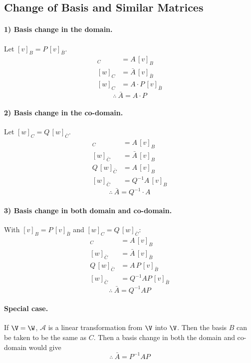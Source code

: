 \subsection{Change of Basis and Similar Matrices}\label{ss:basis-change-rep}

\paragraph{1) Basis change in the domain.} Let $[v]_B=P\,[v]_{\bar B}$.
\begin{align*}
[w]_C&=A\,[v]_B\\
[w]_C&=\bar A\,[v]_{\bar B}\\
[w]_C&=A\cdot P\,[v]_{\bar B}
\end{align*}
\[
\therefore\ \boxed{\bar A=A\cdot P}
\]

\paragraph{2) Basis change in the co-domain.} Let $[w]_C=Q\,[w]_{\bar C}$.
\begin{align*}
[w]_C&=A\,[v]_B\\
[w]_{\bar C}&=\bar A\,[v]_B\\
Q\,[w]_{\bar C}&=A\,[v]_B\\
[w]_{\bar C}&=Q^{-1}A\,[v]_B
\end{align*}
\[
\therefore\ \boxed{\bar A=Q^{-1}\cdot A}
\]

\paragraph{3) Basis change in both domain and co-domain.} With $[v]_B=P\,[v]_{\bar B}$ and $[w]_C=Q\,[w]_{\bar C}$:
\begin{align*}
[w]_C&=A\,[v]_B\\
[w]_{\bar C}&=\bar A\,[v]_{\bar B}\\
Q\,[w]_{\bar C}&=A\,P\,[v]_{\bar B}\\
[w]_{\bar C}&=Q^{-1}AP\,[v]_{\bar B}
\end{align*}
\[
\therefore\ \boxed{\bar A=Q^{-1}AP}
\]

\paragraph{Special case.}
If $\V=\W$, $\mathcal{A}$ is a linear transformation from $\V$ into $\V$. Then the basis $B$ can be taken to be the same as $C$. Then a basis change in both the domain and co-domain would give
\[
\therefore\ \boxed{\bar A=P^{-1}AP}
\]

